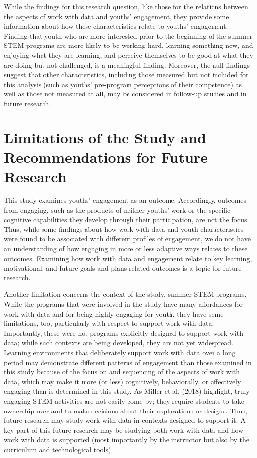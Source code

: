 \documentclass[]{msu-thesis}
\theoremstyle{definition}
\theoremstyle{definition}
\theoremstyle{definition}
\theoremstyle{remark}
\begin{document}
While the findings for this research question, like those for the
relations between the aspects of work with data and youths' engagement,
they provide some information about how these characteristics relate to
youths' engagement. Finding that youth who are more interested prior to
the beginning of the summer STEM programs are more likely to be working
hard, learning something new, and enjoying what they are learning, and
perceive themselves to be good at what they are doing but not
challenged, is a meaningful finding. Moreover, the null findings suggest
that other characteristics, including those measured but not included
for this analysis (such as youths' pre-program perceptions of their
competence) as well as those not measured at all, may be considered in
follow-up studies and in future research.

\section{Limitations of the Study and Recommendations for Future
Research}\label{limitations-of-the-study-and-recommendations-for-future-research}

This study examines youths' engagement as an outcome. Accordingly,
outcomes from engaging, such as the products of neither youths' work or
the specific cognitive capabilities they develop through their
participation, are not the focus. Thus, while some findings about how
work with data and youth characteristics were found to be associated
with different profiles of engagement, we do not have an understanding
of how engaging in more or less adaptive ways relates to these outcomes.
Examining how work with data and engagement relate to key learning,
motivational, and future goals and plans-related outcomes is a topic for
future research.

Another limitation concerns the context of the study, summer STEM
programs. While the programs that were involved in the study have many
affordances for work with data and for being highly engaging for youth,
they have some limitations, too, particularly with respect to support
work with data. Importantly, these were not programs explicitly designed
to support work with data; while such contexts are being developed, they
are not yet widespread. Learning environments that deliberately support
work with data over a long period may demonstrate different patterns of
engagement than those examined in this study because of the focus on and
sequencing of the aspects of work with data, which may make it more (or
less) cognitively, behaviorally, or affectively engaging than is
determined in this study. As Miller et al. (2018) highlight, truly
engaging STEM activities are not easily come by; they require students
to take ownership over and to make decisions about their explorations or
designs. Thus, future research may study work with data in contexts
designed to support it. A key part of this future research may be
studying both work with data and how work with data is supported (most
importantly by the instructor but also by the curriculum and
technological tools).
\end{document}
